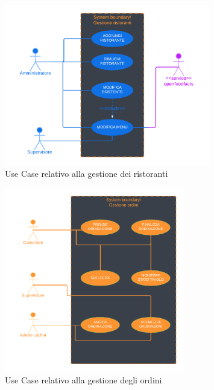     \begin{figure}[H]
        \centering
        \includegraphics[width=0.8\textwidth]{assets/diagrammi/Use-Case/Gestione ristoranti.png}
        \caption{Use Case relativo alla gestione dei ristoranti}
        \label{fig:ucdResturantMgmt}
    \end{figure}

    \begin{figure}[H]
        \centering
        \includegraphics[width=0.7\textwidth]{assets/diagrammi/Use-Case/Gestione ordini.png}
        \caption{Use Case relativo alla gestione degli ordini}
        \label{fig:ucdOrderMgmt}
    \end{figure}
    
